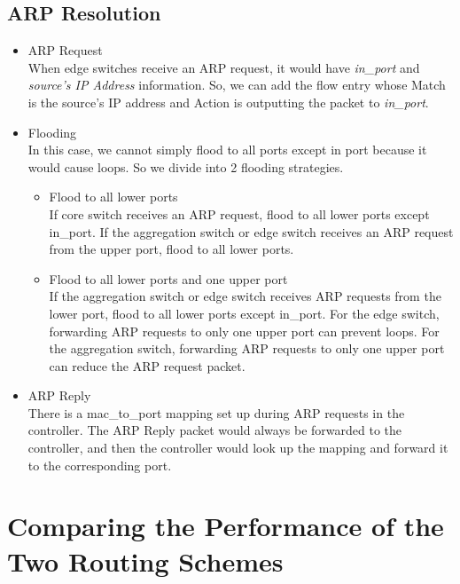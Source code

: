 \documentclass[a4paper,11pt]{article}
\begin{document}
\subsection{ARP Resolution}
\begin{itemize}
    \item ARP Request\\
    When edge switches receive an ARP request, it would have \textit{in\_port} and \textit{source's IP Address} information.  So, we can add the flow entry whose Match is the source's IP address and Action is outputting the packet to \textit{in\_port}.
    \item Flooding\\
    In this case, we cannot simply flood to all ports except in port because it would cause loops.  So we divide into 2 flooding strategies.
    \begin{itemize}
        \item Flood to all lower ports\\
        If core switch receives an ARP request, flood to all lower ports except in\_port.  If the aggregation switch or edge switch receives an ARP request from the upper port, flood to all lower ports.
        \item Flood to all lower ports and one upper port\\
        If the aggregation switch or edge switch receives ARP requests from the lower port, flood to all lower ports except in\_port.  For the edge switch, forwarding ARP requests to only one upper port can prevent loops. For the aggregation switch, forwarding ARP requests to only one upper port can reduce the ARP request packet.
    \end{itemize}
    \item ARP Reply\\
    There is a mac\_to\_port mapping set up during ARP requests in the controller.  The ARP Reply packet would always be forwarded to the controller, and then the controller would look up the mapping and forward it to the corresponding port.
\end{itemize}


\section{Comparing the Performance of the Two Routing Schemes}
\end{document}
